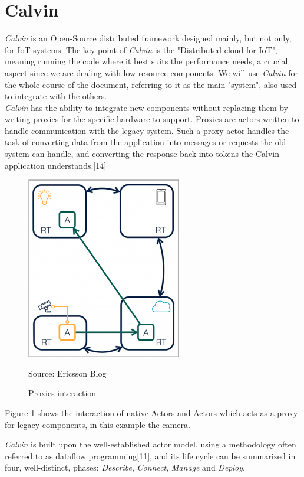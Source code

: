 \section{Calvin}
  \textit{Calvin} is an Open-Source distributed framework designed mainly, but not only,
  for IoT systems. The key point of \textit{Calvin} is the "Distributed cloud for IoT", meaning
  running the code where it best suits the performance needs, a crucial aspect since we are
  dealing with low-resource components. We will use \textit{Calvin} for the whole course of the document,
  referring to it as the main "system", also used to integrate with the others. \\
  \textit{Calvin} has the ability to integrate new components without replacing them by writing
  proxies for the specific hardware to support. Proxies are actors written to handle
  communication with the legacy system. Such a proxy actor handles the task of converting data
  from the application into messages or requests the old system can handle, and converting the
  response back into tokens the Calvin application understands.[14]

        \begin{figure}[h]
        \caption{Proxies interaction}

        \label{fig:calvinproxy}
        \centering
        \includegraphics[scale=0.75]{calvin4.png}
        \par{Source: Ericsson Blog}
        \end{figure}
  Figure \ref{fig:calvinproxy} shows the interaction of native Actors and Actors which
  acts as a proxy for legacy components, in this example the camera.




  \textit{Calvin} is built upon the well-established actor model, using a methodology often referred to as dataflow programming[11], and
  its life cycle can be summarized in four, well-distinct, phases: \textit{Describe}, \textit{Connect}, \textit{Manage}
  and \textit{Deploy}.

